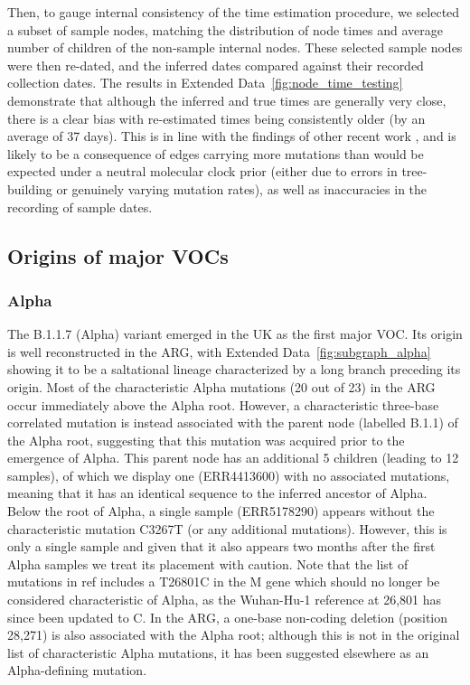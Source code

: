 \documentclass[12pt]{article}
\newcommand{\edref}[1]{Extended Data~\ref{#1}}
\begin{document}
Then, to gauge internal consistency of the time estimation procedure,
we selected a subset of sample nodes,
matching the distribution of node times  and
average number of children of the non-sample internal nodes.
These selected sample nodes were then re-dated, and
the inferred dates compared against their recorded collection dates.
The results in \edref{fig:node_time_testing} demonstrate that
although the inferred and true times are generally very close,
there is a clear bias with re-estimated times
being consistently older (by an average of 37 days).
This is in line with the findings of
other recent work \cite{sanderson2021chronumental}, and
is likely to be a consequence of edges
carrying more mutations than would be expected
under a neutral molecular clock prior
(either due to errors in tree-building or genuinely varying mutation rates),
as well as inaccuracies in the recording of sample dates.

\subsection{Origins of major VOCs}

\subsubsection{Alpha}
\label{sec:dd_alpha}

The B.1.1.7 (Alpha) variant emerged in the UK as the first major VOC.
Its origin is well reconstructed in the ARG,
with \edref{fig:subgraph_alpha}
showing it to be a saltational lineage
characterized by a long branch preceding its origin.
Most of the characteristic Alpha mutations \cite{RambautAlpha2020}
(20 out of 23) in the ARG
occur immediately above the Alpha root.
However, a characteristic three-base correlated mutation
is instead associated with the parent node (labelled B.1.1) of the Alpha root,
suggesting that this mutation was acquired prior to the emergence of Alpha.
This parent node has an additional 5 children
(leading to 12 samples),
of which we display one (ERR4413600)
with no associated mutations,
meaning that it has an identical sequence
to the inferred ancestor of Alpha.
Below the root of Alpha, a single sample (ERR5178290)
appears without the characteristic mutation C3267T
(or any additional mutations).
However, this is only a single sample and
given that it also appears two months after the first Alpha samples
we treat its placement with caution.
Note that the list of mutations in ref\cite{RambautAlpha2020}
includes a T26801C in the M gene
which should no longer be considered characteristic of Alpha,
as the Wuhan-Hu-1 reference at 26,801 has since been updated to C.
In the ARG, a one-base non-coding deletion (position 28,271)
is also associated with the Alpha root;
although this is not in the original list of
characteristic Alpha mutations,
it has been suggested elsewhere as an Alpha-defining
mutation\cite{Li2023indels}.
\end{document}
